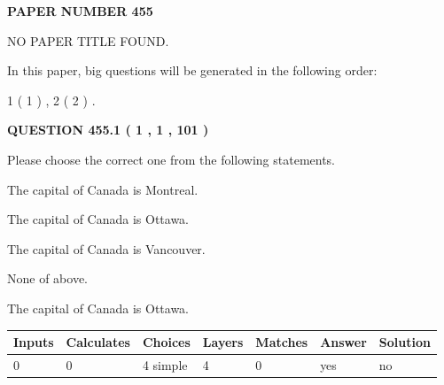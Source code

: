 \documentclass[12pt]{article}
\begin{document}
   
   
   
\newpage 
\setcounter{page}{ 
   455001 } 
   
   
   
   
 {\textbf{ \Large{ PAPER NUMBER  455  }}}
   
   
\vspace{0.2in}
   
   
   
   
   
   
 NO PAPER TITLE FOUND.
   
   
   
\vspace{0.2in}
   
In this paper, big questions will be generated in the following order: 
   
   
   1 ( 1 )
 ,
   2 ( 2 )
 .
  
\vspace{0.2in}
  
{\textbf{\Large{QUESTION
455.1 
 ( 1 , 1 , 101 )
}}}
  
  
Please choose the correct one from the following statements.
 
 
The capital of Canada is Montreal.
 
 
The capital of Canada is Ottawa.
 
 
The capital of Canada is Vancouver.
 
 
 None of above.
 
 
\noindent{}
 
 
The capital of Canada is Ottawa.
 
 
\noindent{}
 
 
   
   
   
   
\noindent\begin{tabular}{|l|l|l|l|l|l|l|}
 \hline
Inputs & Calculates & Choices & Layers & Matches & Answer & Solution \\ \hline
 0  & 
 0  & 
 4
  simple  
  & 
 4  & 
 0  & 
  yes & 
  no 
  \\ \hline
 \end{tabular}
   
\end{document}
